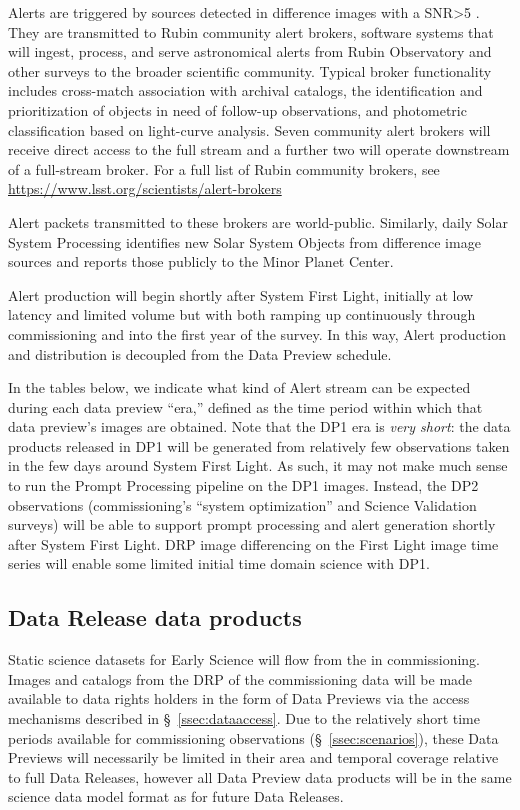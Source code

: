 Alerts are triggered by sources detected in difference images with a SNR>5 .
They are transmitted to Rubin community alert brokers, software systems that will ingest, process, and serve astronomical alerts from Rubin Observatory and other surveys to the broader scientific community.
Typical broker functionality includes cross-match association with archival catalogs, the identification and prioritization of objects in need of follow-up observations, and photometric classification based on light-curve analysis.
Seven community alert brokers will receive direct access to the full stream and a further two will operate downstream of a full-stream broker.
For a full list of Rubin community brokers, see \url{https://www.lsst.org/scientists/alert-brokers}

Alert packets transmitted to these brokers are world-public.
Similarly, daily Solar System Processing identifies new Solar System Objects from difference image sources and reports those publicly to the Minor Planet Center.

Alert production will begin shortly after System First Light, initially at low latency and limited volume but with both ramping up continuously through commissioning and into the first year of the survey.
In this way, Alert production and distribution is decoupled from the Data Preview schedule.

In the tables below, we indicate what kind of Alert stream can be expected during each data preview ``era,'' defined as the time period within which that data preview's images are obtained.
Note that the DP1 era is {\it very short}: the data products released in DP1 will be generated from relatively few observations taken in the few days around System First Light.
As such, it may not make much sense to run the Prompt Processing pipeline on the DP1 images.
Instead, the DP2 observations (commissioning's ``system optimization'' and Science Validation surveys) will be able to support prompt processing and alert generation shortly after System First Light.
DRP image differencing on the First Light image time series will enable some limited initial time domain science with DP1.

\subsection{Data Release data products}

Static science datasets for Early Science will flow from the \svs in commissioning.
Images and catalogs from the DRP of the commissioning data will be made available to data rights holders in the form of Data Previews via the access mechanisms described in \S~\ref{ssec:dataaccess}.
Due to the relatively short time periods available for commissioning observations (\S~\ref{ssec:scenarios}), these Data Previews will necessarily be limited in their area and temporal coverage relative to full Data Releases, however all Data Preview data products will be in the same science data model format as for future Data Releases.

